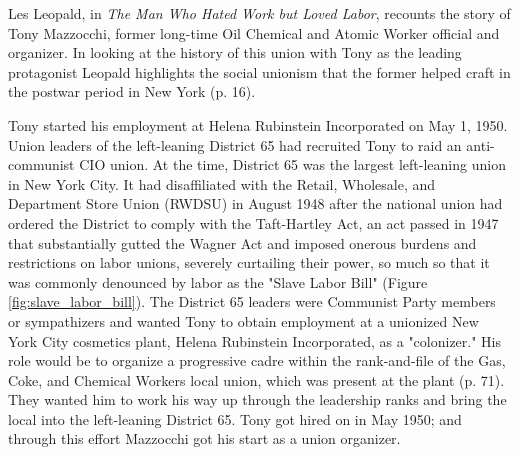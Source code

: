 \documentclass[12pt]{article}
\begin{document}
Les Leopald, in \textit{The Man Who Hated Work but Loved Labor}, recounts the story of Tony Mazzocchi, former long-time Oil Chemical and Atomic Worker official and organizer. In looking at the history of this union with Tony as the leading protagonist Leopald highlights the social unionism that the former helped craft in the postwar period in New York (p. 16).

Tony started his employment at Helena Rubinstein Incorporated on May 1, 1950. Union leaders of the left-leaning District 65 had recruited Tony to raid an anti-communist CIO union. At the time, District 65 was the largest left-leaning union in New York City. It had disaffiliated with the Retail, Wholesale, and Department Store Union (RWDSU) in August 1948 after the national union had ordered the District to comply with the Taft-Hartley Act, an act passed in 1947 that substantially gutted the Wagner Act  and imposed onerous burdens and restrictions on labor unions, severely curtailing their power, so much so that it was commonly denounced by labor as the "Slave Labor Bill" (Figure \ref{fig:slave_labor_bill}). The District 65 leaders were Communist Party members or sympathizers and wanted Tony to obtain employment at a unionized New York City cosmetics plant, Helena Rubinstein Incorporated, as a "colonizer." His role would be to organize a progressive cadre within the rank-and-file of the Gas, Coke, and Chemical Workers local union, which was present at the plant (p. 71). They wanted him to work his way up through the leadership ranks and bring the local into the left-leaning District 65. Tony got hired on in May 1950; and through this effort Mazzocchi got his start as a union organizer.
\end{document}
